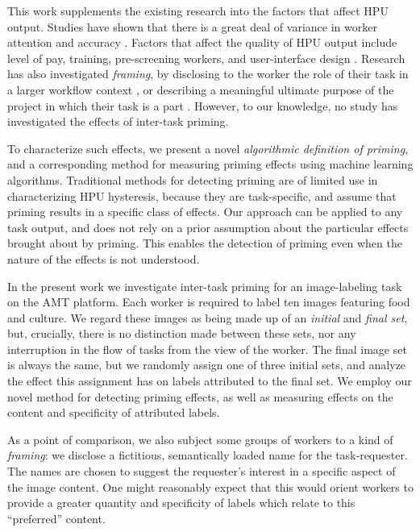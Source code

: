 \documentclass[a4paper]{report}
\begin{document}
This work supplements the existing research into the factors that affect HPU 
output.  Studies have shown that 
there is a great deal of variance in worker attention and 
accuracy \cite{kazai2013analysis}.
Factors that affect the quality of HPU 
output include level of pay\cite{kazai2013analysis}, 
training\cite{le2010ensuring}, pre-screening 
workers\cite{paolacci2010running}, and user-interface design
\cite{Finnerty2013}.  Research has also investigated \textit{framing}, 
by disclosing to the worker the role of
their task in a larger workflow context \cite{Kinnaird2012281}, 
or describing a meaningful ultimate purpose of the project in which their
task is a part \cite{chandler2013breaking}.  However, to our knowledge, no
study has investigated the effects of inter-task priming.

To characterize such effects, we present a novel  
\textit{algorithmic definition of priming}, and a corresponding method for
measuring priming effects using machine learning algorithms.  
Traditional methods for detecting priming are of limited use in characterizing 
HPU hysteresis, because they are task-specific, and assume that priming results
in a specific class of effects.
Our approach can be applied to any task output, and does not rely on a prior 
assumption about the particular effects brought about by priming.  This 
enables the detection of priming even when the nature of the effects is not 
understood.

In the present work we investigate inter-task priming for an image-labeling 
task
on the AMT platform.  Each worker is required to label ten images featuring 
food and culture.  We regard these images as being made up of an 
\textit{initial} and \textit{final set}, but, crucially, there is no
distinction made between these sets, nor any interruption in the flow of tasks 
from the view of the worker.
The final image set is always the same, but we randomly assign one of three 
initial sets, and analyze the effect this assignment has on labels attributed 
to the final set.  We employ our novel method for detecting priming effects, as
well as measuring effects on the content and specificity of attributed labels. 

As a point of comparison, we also subject some groups of workers to a kind of
\textit{framing}: we disclose a fictitious, semantically loaded name for the 
task-requester.  The names are chosen to suggest the requester's interest in a 
specific aspect of the image content.  One might reasonably expect that this 
would orient workers to provide a greater quantity and specificity of labels 
which relate to this ``preferred'' content.
\end{document}
